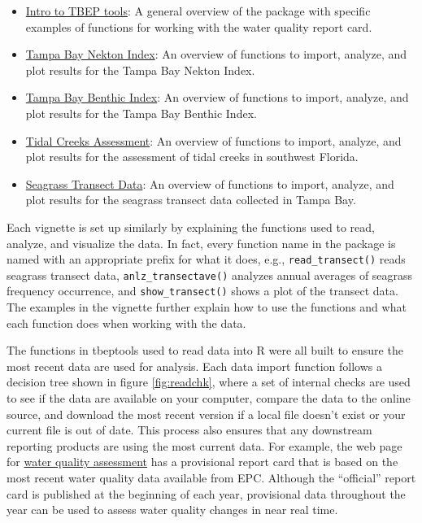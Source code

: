 \documentclass[
]{book}
\providecommand{\tightlist}{%
  \setlength{\itemsep}{0pt}\setlength{\parskip}{0pt}}
\begin{document}
\begin{itemize}
\tightlist
\item
  \href{https://tbep-tech.github.io/tbeptools/articles/intro.html}{Intro to TBEP tools}: A general overview of the package with specific examples of functions for working with the water quality report card.
\item
  \href{https://tbep-tech.github.io/tbeptools/articles/tbni.html}{Tampa Bay Nekton Index}: An overview of functions to import, analyze, and plot results for the Tampa Bay Nekton Index.
\item
  \href{https://tbep-tech.github.io/tbeptools/articles/tbbi.html}{Tampa Bay Benthic Index}: An overview of functions to import, analyze, and plot results for the Tampa Bay Benthic Index.
\item
  \href{https://tbep-tech.github.io/tbeptools/articles/tidalcreeks.html}{Tidal Creeks Assessment}: An overview of functions to import, analyze, and plot results for the assessment of tidal creeks in southwest Florida.
\item
  \href{https://tbep-tech.github.io/tbeptools/articles/seagrasstransect.html}{Seagrass Transect Data}: An overview of functions to import, analyze, and plot results for the seagrass transect data collected in Tampa Bay.
\end{itemize}

Each vignette is set up similarly by explaining the functions used to read, analyze, and visualize the data. In fact, every function name in the package is named with an appropriate prefix for what it does, e.g., \texttt{read\_transect()} reads seagrass transect data, \texttt{anlz\_transectave()} analyzes annual averages of seagrass frequency occurrence, and \texttt{show\_transect()} shows a plot of the transect data. The examples in the vignette further explain how to use the functions and what each function does when working with the data.

The functions in tbeptools used to read data into R were all built to ensure the most recent data are used for analysis. Each data import function follows a decision tree shown in figure \ref{fig:readchk}, where a set of internal checks are used to see if the data are available on your computer, compare the data to the online source, and download the most recent version if a local file doesn't exist or your current file is out of date. This process also ensures that any downstream reporting products are using the most current data. For example, the web page for \href{https://tbep.org/water-quality-report-card/}{water quality assessment} has a provisional report card that is based on the most recent water quality data available from EPC. Although the ``official'' report card is published at the beginning of each year, provisional data throughout the year can be used to assess water quality changes in near real time.
\end{document}
